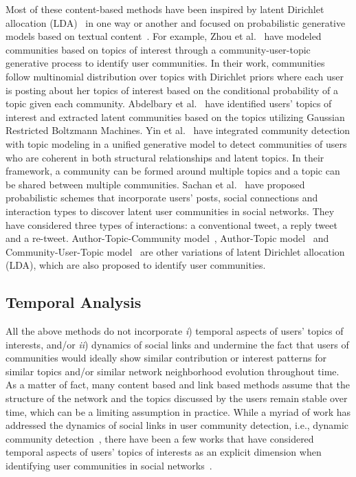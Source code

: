 \documentclass[sigconf]{acmart}
\begin{document}
Most of these content-based methods have been inspired by latent Dirichlet allocation (LDA)~\cite{DBLP:journals/jmlr/BleiNJ03} in one way or another and focused on probabilistic generative models based on textual content~\cite{DBLP:conf/www/ZhouMLGZ06, DBLP:conf/www/SachanCFS12}. For example, Zhou et al.~\cite{DBLP:conf/www/ZhouMLGZ06} have modeled communities based on topics of interest through a community-user-topic generative process to identify user communities. In their work, communities follow multinomial distribution over topics with Dirichlet priors where each user is posting about her topics of interest based on the conditional probability of a topic given each community. Abdelbary et al.~\cite{Abdelbary6918274} have identified users' topics of interest and extracted latent communities based on the topics utilizing Gaussian Restricted Boltzmann Machines. Yin et al.~\cite{DBLP:journals/tist/YinCGH12} have integrated community detection with topic modeling in a unified generative model to detect communities of users who are coherent in both structural relationships and latent topics. In their framework, a community can be formed around multiple topics and a topic can be shared between multiple communities. Sachan et al.~\cite{DBLP:conf/www/SachanCFS12} have proposed probabilistic schemes that incorporate users' posts, social connections and interaction types to discover latent user communities in social networks. They have considered three types of interactions: a conventional tweet, a reply tweet and a re-tweet. Author-Topic-Community model~\cite{DBLP:journals/kais/LiCYZCL15}, Author-Topic model~\cite{DBLP:conf/uai/Rosen-ZviGSS04} and Community-User-Topic model~\cite{DBLP:conf/www/ZhouMLGZ06} are other variations of latent Dirichlet allocation (LDA), which are also proposed to identify user communities.

\subsection{Temporal Analysis}
{\color{blue} All the above methods do not incorporate \textit{i}) temporal aspects of users' topics of interests, and/or \textit{ii}) dynamics of social links and undermine the fact that users of communities would ideally show similar contribution or interest patterns for similar topics and/or similar network neighborhood evolution throughout time. As a matter of fact, many content based and link based methods assume that the structure of the network and the topics discussed by the users remain stable over time, which can be a limiting assumption in practice. While a myriad of work has addressed the dynamics of social links in user community detection, i.e., dynamic community detection~\cite{DBLP:journals/csur/RossettiC18, DBLP:journals/complexity/WuYZSLDH18}, there  have  been  a  few  works  that  have  considered  temporal aspects of users' topics of interests as an explicit dimension when identifying user communities in social networks~\cite{DBLP:conf/aaai/HuYC14, DBLP:conf/sigmod/HuYCX15, DBLP:journals/tois/LiangRZMYR17}. }
\end{document}
